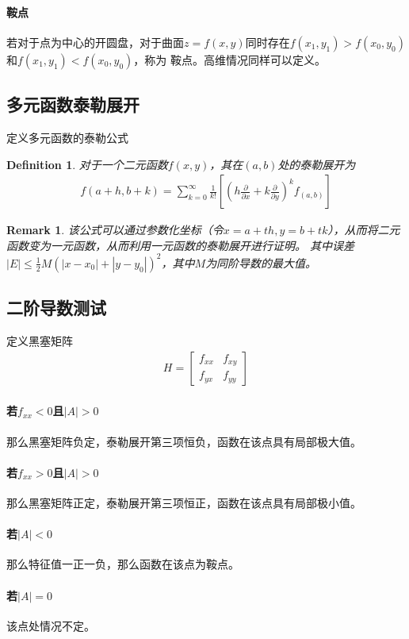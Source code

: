 \documentclass[12pt,a4paper,UTF8]{ctexbook}
\theoremstyle{plain}
\newtheorem{definition}{\indent Definition}[section]
\newtheorem{remark}{\indent Remark}[section]
\begin{document}
\paragraph{鞍点}若对于点为中心的开圆盘，对于曲面$z=f(x,y)$同时存在$f(x_1,y_1)>f(x_0,y_0)$和$f(x_1,y_1)<f(x_0,y_0)$，称为 
鞍点。高维情况同样可以定义。
\subsection{多元函数泰勒展开}
定义多元函数的泰勒公式
\begin{definition}
对于一个二元函数$f(x,y)$，其在$(a,b)$处的泰勒展开为
\begin{align*} 
    f(a+h,b+k)=\sum_{k=0}^\infty \frac{1}{k!}[(h\frac{\partial }{\partial x}+k\frac{\partial}{\partial y})^k f_{(a,b)}]
\end{align*}
\end{definition}
\begin{remark}
该公式可以通过参数化坐标（令$x=a+th,y=b+tk$），从而将二元函数变为一元函数，从而利用一元函数的泰勒展开进行证明。
其中误差$|E|\leq \frac{1}{2}M(|x-x_0|+|y-y_0|)^2$，其中$M$为同阶导数的最大值。
\end{remark}
\subsection{二阶导数测试}
定义黑塞矩阵
\begin{align*} 
    H=\begin{bmatrix}
        f_{xx}&f_{xy}\\
        f_{yx}&f_{yy}
    \end{bmatrix}
\end{align*}
\paragraph{若$f_{xx}<0$且$|A|>0$}那么黑塞矩阵负定，泰勒展开第三项恒负，函数在该点具有局部极大值。
\paragraph{若$f_{xx}>0$且$|A|>0$}那么黑塞矩阵正定，泰勒展开第三项恒正，函数在该点具有局部极小值。
\paragraph{若$|A|<0$}那么特征值一正一负，那么函数在该点为鞍点。
\paragraph{若$|A|=0$}该点处情况不定。
\end{document}
